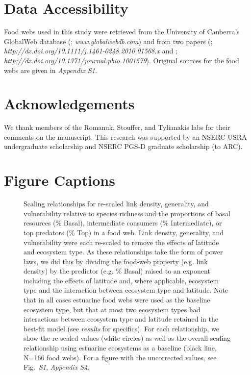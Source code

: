 \documentclass[12pt]{article}
\begin{document}
\section*{Data Accessibility}

  Food webs used in this study were retrieved from the University of Canberra's 
  GlobalWeb database (\citealp{GlobalWeb}; \emph{www.globalwebdb.com}) and from
  two papers (\citealp{Riede2011}; \emph{http://dx.doi.org/10.1111/j.1461-0248.2010.01568.x}
  and \citealp{Dunne2013}; \emph{http://dx.doi.org/10.1371/journal.pbio.1001579}). Original sources for the
  food webs are given in \emph{Appendix S1}.

\section*{Acknowledgements}
  
  We thank members of the Romanuk, Stouffer, and Tylianakis labs for their comments on
  the manuscript.
  This research was supported by an NSERC USRA undergraduate scholarship and NSERC PGS-D 
  graduate scholarship (to ARC).

\newpage

\newpage

\section*{Figure Captions}

\begin{figure}[h]
\caption{Scaling relationships for re-scaled link density, generality, and vulnerability 
relative to species richness and the proportions of basal resources (\% Basal), intermediate 
consumers (\% Intermediate), or top predators (\% Top) in a food web. Link density, generality,
and vulnerability were each re-scaled to remove the effects of latitude and ecosystem
type. As these relationships take the form of power laws, we did this by dividing the food-web
property (e.g. link density) by the predictor (e.g. \% Basal) raised to an exponent including the 
effects of latitude and, where applicable, ecosystem type and the interaction between ecosystem
type and latitude. Note that in all cases estuarine food webs were used as the baseline 
ecosystem type, but that at most two ecosystem types had interactions between ecosystem type and
latitude retained in the best-fit model (see \emph{results} for specifics). For each relationship, 
we show the re-scaled values (white circles) as well as the overall scaling relationship using estuarine
ecosystems as a baseline (black line, N=166 food webs). For a figure with the uncorrected values,
see Fig.~\emph{S1}, \emph{Appendix S4}.}
\label{props_v_lat}
\end{figure}
\end{document}
